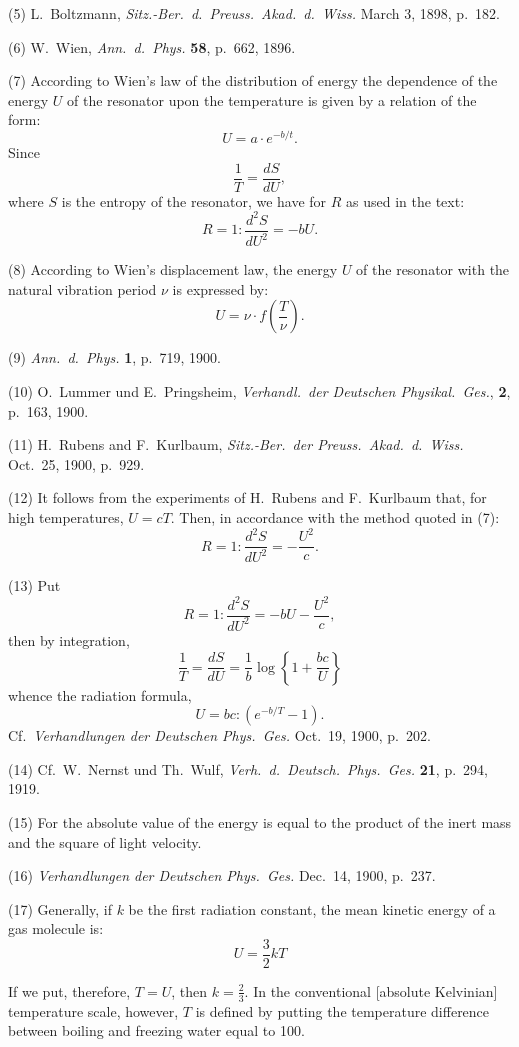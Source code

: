 \documentclass[12pt,oneside]{book}
\begin{document}
(5) L.~Boltzmann, \textit{Sitz.-Ber.\ d.\ Preuss.\ Akad.\ d.\ Wiss.} March 3, 1898, p.\ 182.

(6) W.~Wien, \textit{Ann.\ d.\ Phys.} \textbf{58}, p.\ 662, 1896.

(7) According to Wien's law of the distribution of energy the
dependence of the energy $U$ of the resonator upon the temperature
is given by a relation of the form:
$$U=a \cdot e^{-b/t}.$$
Since
$$\frac{1}{T}=\frac{dS}{dU},$$
where $S$ is the entropy of the resonator, we have for $R$ as used in the text:
$$R=1:\frac{d^2S}{dU^2}=-bU.$$

(8) According to Wien's displacement law, the energy $U$ of the resonator with the
natural vibration period $\nu$ is expressed by: $$U=\nu \cdot f\left(\frac{T}{\nu}\right).$$

(9) \textit{Ann.\ d.\ Phys.} \textbf{1}, p.\ 719, 1900.

(10) O.~Lummer und E.~Pringsheim, \textit{Verhandl.\ der Deutschen Physikal.\ Ges.}, \textbf{2}, p.\ 163, 1900.

(11) H.~Rubens and F.~Kurlbaum, \textit{Sitz.-Ber.\ der Preuss.\ Akad.\ d.\ Wiss.} Oct.\ 25, 1900, p.\ 929.

(12) It follows from the experiments of H.~Rubens and F.~Kurlbaum that, for high temperatures, $U=cT$.
Then, in accordance with the method quoted in (7): $$R=1:\frac{d^2S}{dU^2}=-\frac{U^2}{c}.$$

(13) Put $$R=1:\frac{d^2S}{dU^2}=-bU-\frac{U^2}{c},$$
then by integration, $$\frac{1}{T}=\frac{dS}{dU}=\frac{1}{b}\log \left\{ 1+\frac{bc}{U}\right\} $$
whence the radiation formula, $$U=bc:(e^{-b/T}-1).$$
Cf.\ \textit{Verhandlungen der Deutschen Phys.\ Ges.} Oct.\ 19, 1900, p.\ 202.

(14) Cf.\ W.~Nernst und Th.~Wulf, \textit{Verh.\ d.\ Deutsch.\ Phys.\ Ges.} \textbf{21},
p.\ 294, 1919.

(15) For the absolute value of the energy is equal to the product
of the inert mass and the square of light velocity.

(16) \textit{Verhandlungen der Deutschen Phys.\ Ges.} Dec.\ 14, 1900, p.\ 237.

(17) Generally, if $k$ be the first radiation constant, the mean kinetic
energy of a gas molecule is:$$U=\frac{3}{2}kT$$

If we put, therefore, $T=U$, then $k=\frac{2}{3}$. In the conventional [absolute
Kelvinian] temperature scale, however, $T$ is defined by putting the
temperature difference between boiling and freezing water equal to 100.
\end{document}
